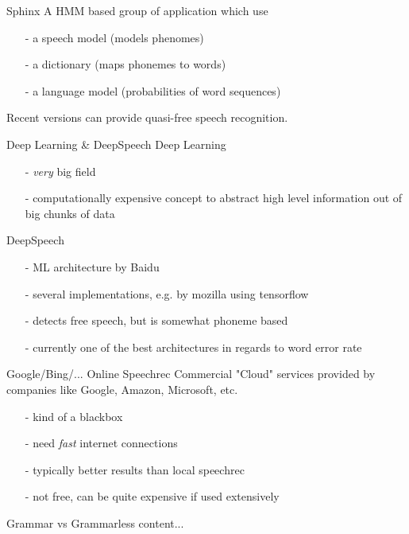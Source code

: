 \documentclass{beamer}
\begin{document}
	\begin{frame}{Sphinx}
		A HMM based group of application which use 
		\begin{itemize}
			\item[-] a speech model (models phenomes)
			\item[-] a dictionary (maps phonemes to words)
			\item[-] a language model (probabilities of word sequences)
		\end{itemize}
		
		Recent versions can provide quasi-free speech recognition.
	\end{frame}
	
	\begin{frame}{Deep Learning \& DeepSpeech}
		Deep Learning
		\begin{itemize}
			\item[-] \emph{very} big field
			\item[-] computationally expensive concept to abstract high level information out of big chunks of data
		\end{itemize}
		\pause
		DeepSpeech
		\begin{itemize}
			\item[-] ML architecture by Baidu
			\item[-] several implementations, e.g. by mozilla using tensorflow
			\item[-] detects free speech, but is somewhat phoneme based
			\item[-] currently one of the best architectures in regards to word error rate
		\end{itemize}
	\end{frame}
	
	\begin{frame}{Google/Bing/... Online Speechrec}
		Commercial "Cloud" services provided by companies like Google, Amazon, Microsoft, etc.
		\begin{itemize}
			\item[-] kind of a blackbox
			\item[-] need \emph{fast} internet connections
			\item[-] typically better results than local speechrec
			\item[-] not free, can be quite expensive if used extensively
		\end{itemize}
	\end{frame}
	
	
	\begin{frame}{Grammar vs Grammarless}
		content...
	\end{frame}
	
\end{document}
